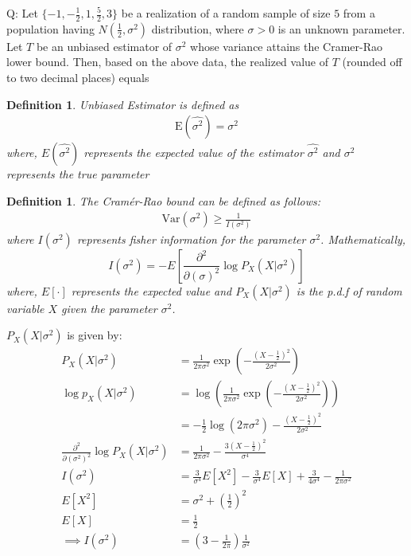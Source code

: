 \documentclass[journal,12pt,onecolumn]{IEEEtran}
\newtheorem{definition}[problem]{Definition}
\theoremstyle{remark}
\begin{document}
\let\vec\mathbf




\vspace{3cm}



\bigskip

\renewcommand{\thefigure}{\theenumi}
\renewcommand{\thetable}{\theenumi}
Q: Let $\{-1, -\frac{1}{2}, 1, \frac{5}{2}, 3\}$ be a realization of a random sample of size $5$ from a population having $N\left(\frac{1}{2}, \sigma^2\right)$ distribution, where $\sigma > 0$ is an unknown parameter. Let $T$ be an unbiased estimator of $\sigma^2$ whose variance attains the Cramer-Rao lower bound. Then, based on the above data, the realized value of $T$ (rounded off to two decimal places) equals
\\ \solution
\fi
\begin{definition}
Unbiased Estimator is defined as
\begin{align}
\text{E}(\hat{\sigma^2}) = {\sigma^2}
\end{align}
where, \(E(\hat{\sigma^2})\) represents the expected value of the estimator \(\hat{\sigma^2}\) and \(\sigma^2\) represents the true parameter
\end{definition}
\begin{definition}
The Cramér-Rao bound can be defined as follows:
\begin{align}
\text{Var}(\sigma^2) \geq \frac{1}{I(\sigma^2)}
\end{align}
where $I(\sigma^2)$ represents fisher information for the parameter $\sigma^2$.
Mathematically,
\begin{equation*}
I(\sigma^2) = -E\left [\frac{\partial^2}{\partial(\sigma)^2}\log P_{X}(X|\sigma^2)\right]
\end{equation*}
where, $E[\cdot]$ represents the expected value and $P_{X}(X|\sigma^2)$ is the p.d.f of random variable $X$ given the parameter $\sigma^2$. 
\end{definition}
$P_X(X|\sigma^2)$ is given by:
\begin{align}
P_X(X|\sigma^2) &= \frac{1}{2\pi\sigma^2} \exp\left(-\frac{(X-\frac{1}{2})^2}{2\sigma^2}\right)\\
\log p_X(X|\sigma^2) &= \log\left(\frac{1}{2\pi\sigma^2} \exp\left(-\frac{(X-\frac{1}{2})^2}{2\sigma^2}\right)\right)\\
&= -\frac{1}{2}\log(2\pi\sigma^2) - \frac{(X-\frac{1}{2})^2}{2\sigma^2}\\
\frac{\partial^2}{\partial(\sigma^2)^2}\log P_X(X|\sigma^2) &= \frac{1}{2\pi\sigma^2} - \frac{3(X-\frac{1}{2})^2}{\sigma^4}\\
I(\sigma^2) &= \frac{3}{\sigma^4} E[X^2] - \frac{3}{\sigma^4} E[X] + \frac{3}{4\sigma^4} - \frac{1}{2\pi\sigma^2}\\
E[X^2] &= \sigma^2 + \left(\frac{1}{2}\right)^2\\
E[X] &= \frac{1}{2}\\
\implies I(\sigma^2) &= \left(3 - \frac{1}{2\pi}\right) \frac{1}{\sigma^2}
\end{align}
\end{document}
